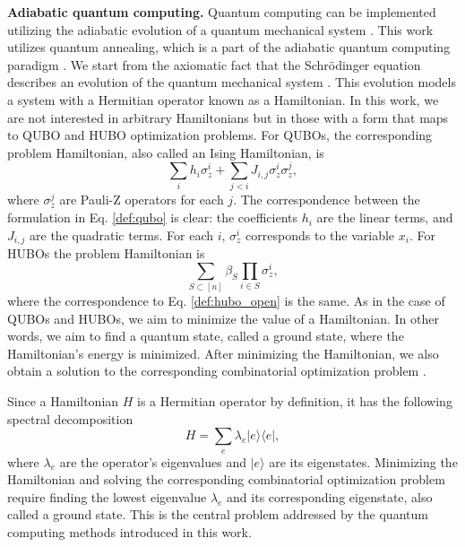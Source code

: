 \textbf{Adiabatic quantum computing.} Quantum computing can be implemented utilizing the adiabatic evolution of a quantum mechanical system \cite{Farhi_Goldstone_Gutmann_Sipser_2000}. This work utilizes quantum annealing, which is a part of the adiabatic quantum computing paradigm \cite{Lidar_adiabatic}. We start from the axiomatic fact that the Schrödinger equation describes an evolution of the quantum mechanical system \cite{Nielsen_Chuang_2010}. This evolution models a system with a Hermitian operator known as a Hamiltonian. In this work, we are not interested in arbitrary Hamiltonians but in those with a form that maps to QUBO and HUBO optimization problems. For QUBOs, the corresponding problem Hamiltonian, also called an Ising Hamiltonian, is
\begin{displaymath}
\sum_{i} h_i \sigma_{z}^{i} + \sum_{j < i} J_{i,j}\sigma_{z}^{i}\sigma_{z}^{j},
\end{displaymath}
where $\sigma_{z}^{j}$ are Pauli-Z operators for each $j$. The correspondence between the formulation in Eq. \eqref{def:qubo} is clear: the coefficients $h_i$ are the linear terms, and $J_{i,j}$ are the quadratic terms. For each $i$, $\sigma_{z}^{i}$ corresponds to the variable $x_i$. For HUBOs the problem Hamiltonian is
\begin{displaymath}
    \sum_{S \subset [n]}\beta_{S}\prod_{i \in S}\sigma_{z}^{i},
\end{displaymath}
where the correspondence to Eq. \eqref{def:hubo_open} is the same. As in the case of QUBOs and HUBOs, we aim to minimize the value of a Hamiltonian. In other words, we aim to find a quantum state, called a ground state, where the Hamiltonian's energy is minimized. After minimizing the Hamiltonian, we also obtain a solution to the corresponding combinatorial optimization problem \cite{Farhi_Goldstone_Gutmann_Sipser_2000}.

Since a Hamiltonian $H$ is a Hermitian operator by definition, it has the following spectral decomposition
\begin{displaymath}
    H = \sum_{e} \lambda_{e}|e\rangle \langle e|,
\end{displaymath}
where $\lambda_{e}$ are the operator's eigenvalues and $|e\rangle$ are its eigenstates. Minimizing the Hamiltonian and solving the corresponding combinatorial optimization problem require finding the lowest eigenvalue $\lambda_{e}$ and its corresponding eigenstate, also called a ground state. This is the central problem addressed by the quantum computing methods introduced in this work.

